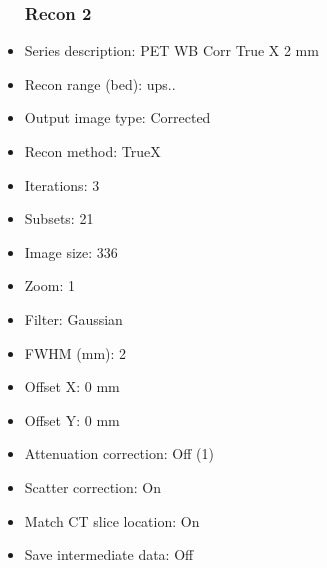 \documentclass[12pt]{article}
\begin{document}
\begin{itemize}
\subsubsection{Recon 2}
\item Series description: PET WB Corr True X 2 mm
\item Recon range (bed): ups..
\item Output image type: Corrected
\item Recon method: TrueX
\item Iterations: 3
\item Subsets: 21
\item Image size: 336
\item Zoom: 1
\item Filter: Gaussian
\item FWHM (mm): 2
\item Offset X: 0 mm
\item Offset Y: 0 mm
\item Attenuation correction: Off (1)
\item Scatter correction: On
\item Match CT slice location: On
\item Save intermediate data: Off
\end{itemize}
\end{document}
